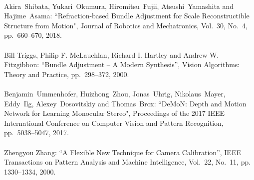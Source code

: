 \begin{mythebibliography}{}
\leavevmode \\Akira~Shibata, Yukari~Okumura, Hiromitsu~Fujii, Atsushi~Yamashita and Hajime~Asama:
\newblock``Refraction-based Bundle Adjustment for Scale Reconstructible Structure from Motion",
\newblock Journal of Robotics and Mechatronics, Vol.~30, No.~4, pp.~660--670, 2018.
\\

\leavevmode \\Bill Triggs, Philip F. McLauchlan, Richard I. Hartley and Andrew W. Fitzgibbon:
\newblock ``Bundle Adjustment -- A Modern Synthesis'',
\newblock Vision Algorithms: Theory and Practice, pp.~298--372, 2000.
\\

\leavevmode \\Benjamin~Ummenhofer, Huizhong~Zhou, Jonas~Uhrig, Nikolaus~Mayer, Eddy~Ilg, Alexey~Dosovitskiy and Thomas~Brox:
\newblock``DeMoN: Depth and Motion Network for Learning Monocular Stereo",
\newblock Proceedings of the 2017 IEEE International Conference on Computer Vision and Pattern Recognition, pp.~5038--5047, 2017.
\\



\leavevmode \\Zhengyou Zhang:
\newblock ``A Flexible New Technique for Camera Calibration'',
\newblock IEEE Transactions on Pattern Analysis and Machine Intelligence, Vol.~22, No.~11, pp. 1330--1334, 2000.
\\


%

%
%



\end{mythebibliography}
